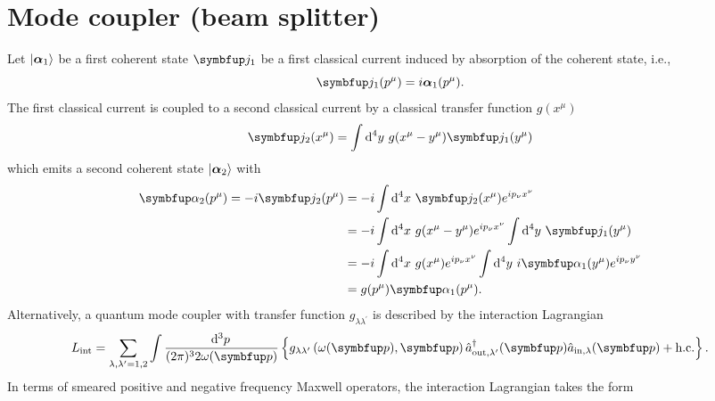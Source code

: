 \section{Mode coupler (beam splitter)}

Let $\lvert\boldsymbol{\alpha}_1\rangle$ be a first coherent state $\vb{j}_1$ be a first classical current induced by absorption of the coherent state, i.e.,
\begin{equation*}
	\vb{j}_1(p^\mu)
	=
	i\boldsymbol{\alpha}_1(p^\mu)
	.
\end{equation*}
The first classical current is coupled to a second classical current by a classical transfer function $g(x^\mu)$
\begin{equation*}
	\vb{j}_2(x^\mu)
	=
	\int\dd[4]{y}
	g(x^\mu-y^\mu)
	\vb{j}_1(y^\mu)
\end{equation*}
which emits a second coherent state $\lvert\boldsymbol{\alpha}_2\rangle$ with
\begin{equation*}
	\begin{split}
		\vb{\alpha}_2(p^\mu)
		=
		-i\vb{j}_2(p^\mu)
		&=
		-i
		\int\dd[4]{x}
		\vb{j}_2(x^\mu)
		e^{ip_\nu x^\nu}
		\\
		&=
		-i
		\int\dd[4]{x}
		g(x^\mu-y^\mu)
		e^{ip_\nu x^\nu}
		\int\dd[4]{y}
		\vb{j}_1(y^\mu)
		\\
		&=
		-i
		\int\dd[4]{x}
		g(x^\mu)
		e^{ip_\nu x^\nu}
		\int\dd[4]{y}
		i\vb{\alpha}_1(y^\mu)
		e^{ip_\nu y^\nu}
		\\
		&=
		g(p^\mu)
		\vb{\alpha}_1(p^\mu)
		.
	\end{split}
\end{equation*}
Alternatively, a quantum mode coupler with transfer function $g_{\lambda\lambda^\prime}$ is described by the interaction Lagrangian
\begin{equation}
	L_\text{int}
	=
	\sum_{\lambda,\lambda^\prime=1,2}
	\int\frac{\dd[3]{p}}{(2\pi)^32\omega(\vb{p})}
	\left\{
		g_{\lambda\lambda^\prime}\left(\omega(\vb{p}),\vb{p}\right)
		\hat{a}_{\text{out},\lambda^\prime}^\dagger(\vb{p})
		\hat{a}_{\text{in},\lambda}(\vb{p})
		+
		\text{h.c.}
	\right\}
	.
\end{equation}
In terms of smeared positive and negative frequency Maxwell operators, the interaction Lagrangian takes the form~\cite[p.~130]{Haroche2006}
